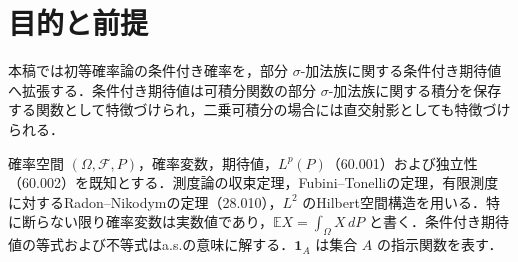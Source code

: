 \documentclass[a5paper,10pt,onecolumn]{jsarticle}
\theoremstyle{mathnotetheorem}
\newcommand{\F}{\mathcal F}
\newcommand{\E}{\mathbb E}
\newcommand{\1}{\mathbf{1}}
\begin{document}
\section{目的と前提}
本稿では初等確率論の条件付き確率を，部分 $\sigma$-加法族に関する条件付き期待値へ拡張する．条件付き期待値は可積分関数の部分 $\sigma$-加法族に関する積分を保存する関数として特徴づけられ，二乗可積分の場合には直交射影としても特徴づけられる．

確率空間 $(\Omega,\F,P)$，確率変数，期待値，$L^p(P)$（60.001）および独立性（60.002）を既知とする．測度論の収束定理，Fubini--Tonelliの定理，有限測度に対するRadon--Nikodymの定理（28.010），$L^2$ のHilbert空間構造を用いる．特に断らない限り確率変数は実数値であり，$\E X=\int_\Omega X\,dP$ と書く．条件付き期待値の等式および不等式はa.s.の意味に解する．$\1_A$ は集合 $A$ の指示関数を表す．
\end{document}
